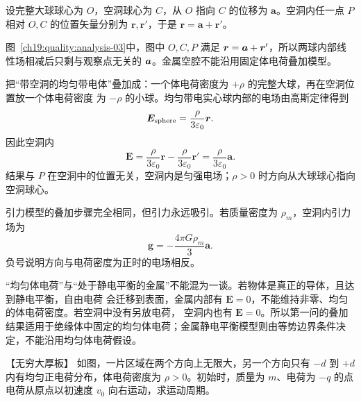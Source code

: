 \begin{xesolution}
设完整大球球心为 $O$，空洞球心为 $C$，从 $O$ 指向 $C$ 的位移为 $\boldsymbol a$。空洞内任一点
$P$ 相对 $O,C$ 的位置矢量分别为 $\boldsymbol r,\boldsymbol r'$，于是
$\boldsymbol r=\boldsymbol a+\boldsymbol r'$。

\begin{qualityfigure}
\cavityFigure
{}\label{ch19:quality:analysis-03}
\end{qualityfigure}
图~\ref{ch19:quality:analysis-03}中，图中 $O,C,P$ 满足 $\bm{r}=\bm{a}+\bm{r}'$，所以两球内部线性场相减后只剩与观察点无关的 $\bm{a}$。金属空腔不能沿用固定体电荷叠加模型。

把“带空洞的均匀带电体”叠加成：一个体电荷密度为 $+\rho$ 的完整大球，再在空洞位置放一个体电荷密度
为 $-\rho$ 的小球。均匀带电实心球内部的电场由高斯定律得到
\[
  \boldsymbol E_{\rm sphere}=\frac{\rho}{3\varepsilon_0}\boldsymbol r.
\]
因此空洞内
\[
  \boldsymbol E
  =\frac{\rho}{3\varepsilon_0}\boldsymbol r
  -\frac{\rho}{3\varepsilon_0}\boldsymbol r'
  =\boxed{\frac{\rho}{3\varepsilon_0}\boldsymbol a}.
\]
结果与 $P$ 在空洞中的位置无关，空洞内是匀强电场；$\rho>0$ 时方向从大球球心指向空洞球心。

引力模型的叠加步骤完全相同，但引力永远吸引。若质量密度为 $\rho_m$，空洞内引力场为
\[
  \boxed{\boldsymbol g=-\frac{4\pi G\rho_m}{3}\boldsymbol a}.
\]
负号说明方向与电荷密度为正时的电场相反。

“均匀体电荷”与“处于静电平衡的金属”不能混为一谈。若物体是真正的导体，且达到静电平衡，自由电荷
会迁移到表面，金属内部有 $\boldsymbol E=0$，不能维持非零、均匀的体电荷密度。若空洞中没有另放电荷，
空洞内也有 $\boldsymbol E=0$。所以第一问的叠加结果适用于绝缘体中固定的均匀体电荷；金属静电平衡模型则由等势边界条件决定，不能沿用均匀体电荷假设。
\end{xesolution}



\begin{origexamplebox}{【无穷大厚板】}\label{ch19:ex:s32-1-6}
如图，一片区域在两个方向上无限大，另一个方向只有 $-d$ 到 $+d$ 内有均匀正电荷分布，体电荷密度为
$\rho>0$。初始时，质量为 $m$、电荷为 $-q$ 的点电荷从原点以初速度 $v_0$ 向右运动，求运动周期。
\par\noindent\begin{minipage}{\linewidth}
\emSlabQuestion
{}\label{ch19:fig:em-question-6}
\end{minipage}\par\medskip
\end{origexamplebox}\par\nopagebreak[4]

